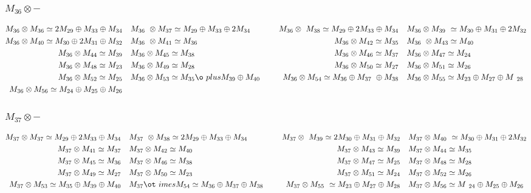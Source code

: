 \subsubsection{$M_36\otimes -$}
\begin{align*}
M_{36} \otimes M_{36} \simeq 2 M_{29} \oplus M_{33} \oplus M_{34} &&& M_{36} \
\otimes M_{37} \simeq M_{29} \oplus M_{33} \oplus 2 M_{34} &&& M_{36} \otimes \
M_{38} \simeq M_{29} \oplus 2 M_{33} \oplus M_{34} &&& M_{36} \otimes M_{39} \
\simeq M_{30} \oplus M_{31} \oplus 2 M_{32}\\
M_{36} \otimes M_{40} \simeq M_{30} \oplus 2 M_{31} \oplus M_{32} &&& M_{36} \
\otimes M_{41} \simeq M_{36} &&& M_{36} \otimes M_{42} \simeq M_{35} &&& M_{36\
} \otimes M_{43} \simeq M_{40}\\
M_{36} \otimes M_{44} \simeq M_{39} &&& M_{36} \otimes M_{45} \simeq M_{38} &&\
& M_{36} \otimes M_{46} \simeq M_{37} &&& M_{36} \otimes M_{47} \simeq M_{24}\
\\
M_{36} \otimes M_{48} \simeq M_{23} &&& M_{36} \otimes M_{49} \simeq M_{28} &&\
& M_{36} \otimes M_{50} \simeq M_{27} &&& M_{36} \otimes M_{51} \simeq M_{26}\
\\
M_{36} \otimes M_{52} \simeq M_{25} &&& M_{36} \otimes M_{53} \simeq M_{35} \o\
plus M_{39} \oplus M_{40} &&& M_{36} \otimes M_{54} \simeq M_{36} \oplus M_{37\
} \oplus M_{38} &&& M_{36} \otimes M_{55} \simeq M_{23} \oplus M_{27} \oplus M\
_{28}\\
M_{36} \otimes M_{56} \simeq M_{24} \oplus M_{25} \oplus M_{26}\\
\end{align*}

\subsubsection{$M_37\otimes -$}
\begin{align*}
M_{37} \otimes M_{37} \simeq M_{29} \oplus 2 M_{33} \oplus M_{34} &&& M_{37} \
\otimes M_{38} \simeq 2 M_{29} \oplus M_{33} \oplus M_{34} &&& M_{37} \otimes \
M_{39} \simeq 2 M_{30} \oplus M_{31} \oplus M_{32} &&& M_{37} \otimes M_{40} \
\simeq M_{30} \oplus M_{31} \oplus 2 M_{32}\\
M_{37} \otimes M_{41} \simeq M_{37} &&& M_{37} \otimes M_{42} \simeq M_{40} &&\
& M_{37} \otimes M_{43} \simeq M_{39} &&& M_{37} \otimes M_{44} \simeq M_{35}\
\\
M_{37} \otimes M_{45} \simeq M_{36} &&& M_{37} \otimes M_{46} \simeq M_{38} &&\
& M_{37} \otimes M_{47} \simeq M_{25} &&& M_{37} \otimes M_{48} \simeq M_{28}\
\\
M_{37} \otimes M_{49} \simeq M_{27} &&& M_{37} \otimes M_{50} \simeq M_{23} &&\
& M_{37} \otimes M_{51} \simeq M_{24} &&& M_{37} \otimes M_{52} \simeq M_{26}\
\\
M_{37} \otimes M_{53} \simeq M_{35} \oplus M_{39} \oplus M_{40} &&& M_{37} \ot\
imes M_{54} \simeq M_{36} \oplus M_{37} \oplus M_{38} &&& M_{37} \otimes M_{55\
} \simeq M_{23} \oplus M_{27} \oplus M_{28} &&& M_{37} \otimes M_{56} \simeq M\
_{24} \oplus M_{25} \oplus M_{26}\\
\end{align*}

